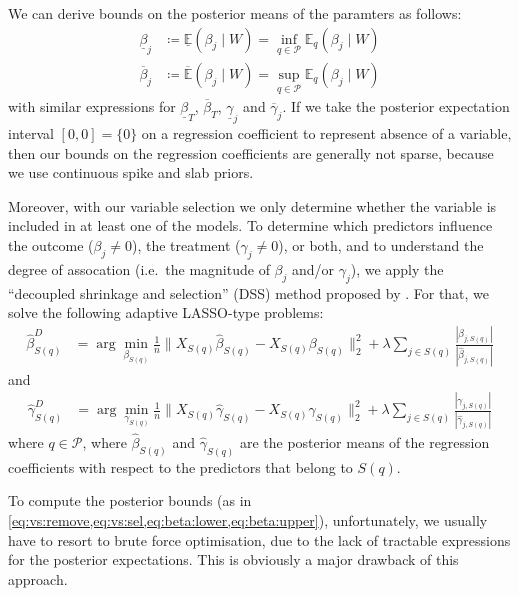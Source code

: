 \documentclass[preprint,12pt]{elsarticle}
\newcommand{\lexp}{\underline{\mathbb{E}}}
\newcommand{\uexp}{\overline{\mathbb{E}}}
\begin{document}
We can derive bounds on the posterior means of the paramters as follows:
\begin{align}
\label{eq:beta:lower}
\underline{\beta}_j&\coloneqq\lexp (\beta_j\mid W)= \inf_{q\in \mathcal{P}} \mathbb{E}_q(\beta_j\mid W) \\
\label{eq:beta:upper}
\overline{\beta}_j&\coloneqq\uexp (\beta_j\mid W)=\sup_{q\in \mathcal{P}} \mathbb{E}_q(\beta_j\mid W)
\end{align}
with similar expressions for 
$\underline{\beta}_T$, $\overline{\beta}_T$,
$\underline{\gamma}_j$ and $\overline{\gamma}_j$.
If we take the posterior expectation interval $[0,0]=\{0\}$ on a regression coefficient to represent absence of a variable, then our bounds on the regression coefficients are generally not sparse, because we use continuous 
spike and slab priors.

Moreover, with our variable selection we only determine whether the variable 
is included in at least one of the models.
To determine which predictors
influence the outcome ($\beta_j\neq 0$),
the treatment ($\gamma_j\neq 0$), or both,
and to understand the degree of assocation
(i.e.\ the magnitude of $\beta_j$ and/or $\gamma_j$),
we apply the 
``decoupled shrinkage and selection'' (DSS) method proposed by \citep{hahn2015}. 
For that, we solve the following adaptive LASSO-type \citep{Zou2006}
problems:
\begin{align}
	\hat{\beta}^D_{S(q)} &= 
	\arg\min_{\beta_{S(q)}} \frac{1}{n}\|X_{S(q)}\hat{\beta}_{S(q)}
	- X_{S(q)} \beta_{S(q)}\|_2^2 + \lambda\sum_{j\in S(q)} 
	\frac{|\beta_{j,S(q)}|}{|\hat{\beta}_{j,S(q)}|}
\end{align}
and
\begin{align}
	\hat{\gamma}^D_{S(q)} &= 
	\arg\min_{\gamma_{S(q)}} \frac{1}{n}\|X_{S(q)}\hat{\gamma}_{S(q)}
	- X_{S(q)} \gamma_{S(q)}\|_2^2 + \lambda\sum_{j\in S(q)} 
	\frac{|\gamma_{j,S(q)}|}{|\hat{\gamma}_{j,S(q)}|}
\end{align}
where $q\in \mathcal{P}$,
where $\hat{\beta}_{S(q)}$ 
and $\hat{\gamma}_{S(q)}$ are the posterior means 
of the regression coefficients with respect to
the predictors that belong to $S(q)$.

To compute the posterior bounds (as in \cref{eq:vs:remove,eq:vs:sel,eq:beta:lower,eq:beta:upper}), unfortunately, we usually have to resort to brute force optimisation, due to the lack of tractable expressions for the posterior expectations. 
This is obviously a major drawback of this approach.
\end{document}
